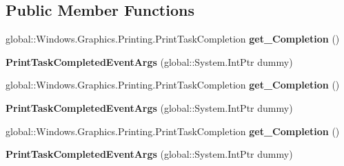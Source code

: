 \subsection*{Public Member Functions}
\begin{DoxyCompactItemize}
\item 
\mbox{\label{class_windows_1_1_graphics_1_1_printing_1_1_print_task_completed_event_args_a63a585da0f76212b2b6c1936f99420e9}} 
global\+::\+Windows.\+Graphics.\+Printing.\+Print\+Task\+Completion {\bfseries get\+\_\+\+Completion} ()
\item 
\mbox{\label{class_windows_1_1_graphics_1_1_printing_1_1_print_task_completed_event_args_a067b1a43100c334c3d982bb6505a5aaf}} 
{\bfseries Print\+Task\+Completed\+Event\+Args} (global\+::\+System.\+Int\+Ptr dummy)
\item 
\mbox{\label{class_windows_1_1_graphics_1_1_printing_1_1_print_task_completed_event_args_a63a585da0f76212b2b6c1936f99420e9}} 
global\+::\+Windows.\+Graphics.\+Printing.\+Print\+Task\+Completion {\bfseries get\+\_\+\+Completion} ()
\item 
\mbox{\label{class_windows_1_1_graphics_1_1_printing_1_1_print_task_completed_event_args_a067b1a43100c334c3d982bb6505a5aaf}} 
{\bfseries Print\+Task\+Completed\+Event\+Args} (global\+::\+System.\+Int\+Ptr dummy)
\item 
\mbox{\label{class_windows_1_1_graphics_1_1_printing_1_1_print_task_completed_event_args_a63a585da0f76212b2b6c1936f99420e9}} 
global\+::\+Windows.\+Graphics.\+Printing.\+Print\+Task\+Completion {\bfseries get\+\_\+\+Completion} ()
\item 
\mbox{\label{class_windows_1_1_graphics_1_1_printing_1_1_print_task_completed_event_args_a067b1a43100c334c3d982bb6505a5aaf}} 
{\bfseries Print\+Task\+Completed\+Event\+Args} (global\+::\+System.\+Int\+Ptr dummy)

\end{DoxyCompactItemize}
